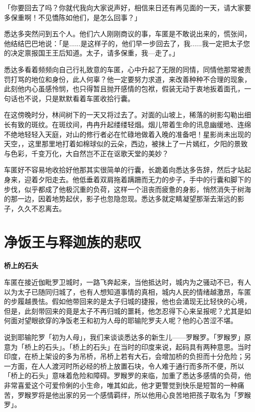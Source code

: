 \documentclass[twoside,openany]{book}
\newcommand{\mt}[1]{\textbullet \textbf{#1}}
\begin{document}
「你要回去了吗？你就代我向大家说声好，相信来日还有再见面的一天，请大家要多保重啊！不见憍陈如他们，是怎么回事？」

悉达多突然问到五个人。他们六人刚刚商议的事，车匿是不敢说出来的，慌张间，他结结巴巴地说：「是......是这样子的，他们早一步回去了，我......我一定把太子您的决定禀报国王王后知道。太子，请多保重，我---走了。」

悉达多看着频频向自己行礼致意的车匿，心中升起了无限的同情，同情他那常被责罚打骂的地位和身份，此人何辜？他一定要努力求道，来改善种种不合理的现象，此刻他内心虽感怜悯，也只得暂且抛开感情的包袱，假装无动于衷地扳着面孔，一句话也不说，只是默默看着车匿收拾行囊。

在这傍晚时分，林间树下的一天又将过去了。对面的山坡上，稀落的树影勾勒出细长有致的斑纹。在斑纹间，冉冉升起缕缕轻烟。烟儿带着生命的讯息幽缓地、连绵不绝地轻轻入天庭，对山的修行者必在忙碌地做着入晚的准备吧！星影尚未出现的天空，，这里那里地打着如棉球似的云朵，西边，被抹上了一片嫣红，夕阳的景致与色彩，千变万化，大自然岂不正在讴歌天堂的美妙？

车匿好不容易地收拾好他那其实很简单的行囊，长跪着向悉达多告辞，然后才站起身来，迎着夕阳走去。他低垂着双肩拖着蹒跚而无力的步子，手中的行囊和脚下的步伐，似乎都成了他极沉重的负荷，这样一个沮丧而疲惫的身影，悄然消失于树海的那一边，因着地势起伏，影子也忽隐忽现。悉达多就定睛凝望那渐去渐远的影子，久久不忍离去。

\section{净饭王与释迦族的悲叹}\label{sec1.4}

\mt{桥上的石头}

车匿在接近伽毗罗卫城时，一路飞奔起来，当他抵达时，城内为之骚动不已，有人以为太子已随同归城了，也有人想知道事情的真相，城内人民的情绪越激昂，车匿的步履越畏怯。假如他带回来的是太子归城的捷报，他也会涌现无比轻快的心境，但是，此刻带回来的竟是太子不再归城的噩耗，他怎忍得下心来呈报呢？尤其是如何面对望眼欲穿的净饭老王和初为人母的耶输陀罗夫人呢？他的心苦涩不堪。

说到耶输陀罗「初为人母」，我们来谈谈悉达多的新生儿——罗睺罗。「罗睺罗」原意为「桥上的石头」。「桥上的石头」在当时的印度来说，起码具有两种意思。当时印度，在桥上架设的多为吊桥，吊桥上若有大石，会增加桥的负担而十分危险；另一方面，在人人渡河时所必经的桥上放置石块，令人难于通行而多所不便，所以「桥上的石头」意味着危险和障碍。罗睺罗的来临，加重了悉达多感情的负荷，他非常喜爱这个可爱伶俐的小生命，唯其如此，他才更警觉到快乐是短暂的一种痛苦，罗睺罗将是他出家的另一个感情羁绊，所以他用心良苦地把孩子取名为「罗睺罗」。
\end{document}
